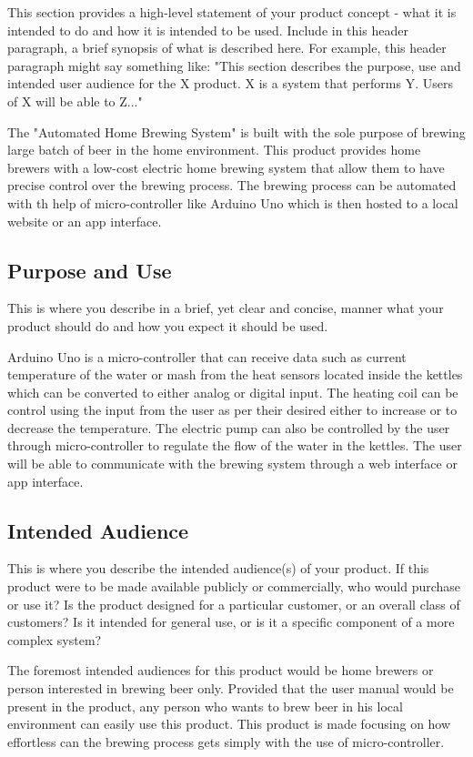 This section provides a high-level statement of your product concept - what it is intended to do and how it is intended to be used. Include in this header paragraph, a brief synopsis of what is described here. For example, this header paragraph might say something like: "This section describes the purpose, use and intended user audience for the X product. X is a system that performs Y. Users of X will be able to Z..."

The "Automated Home Brewing System" is built with the sole purpose of brewing large batch of beer in the home environment. This product provides home brewers with a low-cost electric home brewing system that allow them to have precise control over the brewing process. The brewing process can be automated with th help of micro-controller like Arduino Uno which is then hosted to a local website or an app interface.

\subsection{Purpose and Use}
This is where you describe in a brief, yet clear and concise, manner what your product should do and how you expect it should be used.

Arduino Uno is a micro-controller that can receive data such as current temperature of the water or mash from the heat sensors located inside the kettles which can be converted to either analog or digital input. The heating coil can be control using the input from the user as per their desired either to increase or to decrease the temperature. The electric pump can also be controlled by the user through micro-controller to regulate the flow of the water in the kettles. The user will be able to communicate with the brewing system through a web interface or app interface.

\subsection{Intended Audience}
This is where you describe the intended audience(s) of your product. If this product were to be made available publicly or commercially, who would purchase or use it? Is the product designed for a particular customer, or an overall class of customers? Is it intended for general use, or is it a specific component of a more complex system?

The foremost intended audiences for this product would be home brewers or person interested in brewing beer only. Provided that the user manual would be present in the product, any person who wants to brew beer in his local environment can easily use this product. This product is made focusing on how effortless can the brewing process gets simply with the use of micro-controller.

